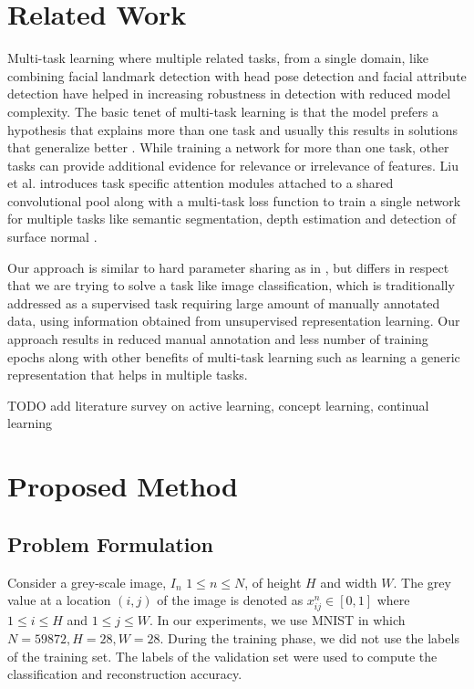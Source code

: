 \documentclass{uai2021} %
\begin{document}
\section{Related Work} \label{related_works}
Multi-task learning where multiple related tasks, from a single domain, like combining facial landmark detection with head pose detection and facial attribute detection \cite{zhang2014facial} have helped in increasing robustness in detection with reduced model complexity.
The basic tenet of multi-task learning is that the model prefers a hypothesis that explains more than one task and usually this results in solutions that generalize better \cite{ruder2017overview}.
While training a network for more than one task, other tasks can provide additional evidence for relevance or irrelevance of features.
Liu et al. introduces task specific attention modules attached to a shared convolutional pool  along with a multi-task loss function to train a single network for multiple tasks like semantic segmentation, depth estimation and detection of surface normal \cite{liu2019end}.

Our approach is similar to hard parameter sharing as in \cite{zhang2014facial} \cite{dai2016instance}, but differs in respect that we are trying to solve a task like image classification, which is traditionally addressed as a supervised task requiring large amount of manually annotated data, using information obtained from  unsupervised representation learning.
Our approach results in reduced manual annotation and less number of training epochs along with other benefits of multi-task learning such as learning a generic representation that helps in multiple tasks.

TODO add literature survey on active learning, concept learning, continual learning

\section{Proposed Method} \label{proposed_method}

\subsection{Problem Formulation} \label{problem_formulation}
Consider a grey-scale image, $I_n$  $1\leq n \leq N$,  of height  $H$ and width $W$. The grey value at a location $(i, j)$ of the image is denoted  as $x_{ij}^{n} \in [0,1]$  where $1 \leq i \leq H$  and  $1\leq j \leq W$.
In our experiments, we use MNIST in which $N= 59872, H=28,  W= 28$. During the training phase, we did not use the labels of the training set.
The labels of the validation set were used to compute the classification and reconstruction accuracy.
\end{document}
